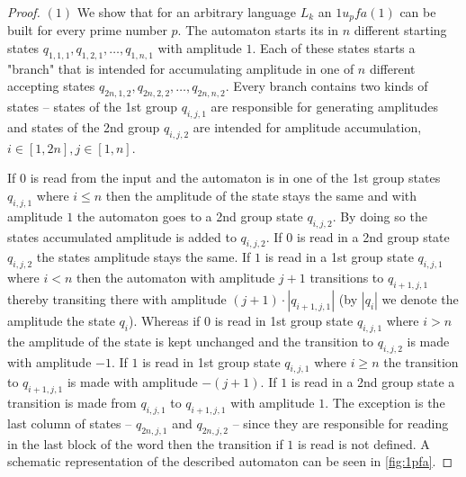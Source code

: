 \documentclass{llncs}
\begin{document}
\begin{definicija}
\begin{proof}
$(1)$ We show that for an arbitrary language $L_k$ an $1u_pfa(1)$ can be built for every prime number $p$. The automaton starts its in $n$ different starting states $q_{1,1,1},q_{1,2,1},\ldots,q_{1,n,1}$ with amplitude $1$. Each of these states starts a "branch" that is intended for accumulating amplitude in one of $n$ different accepting states $q_{2n,1,2},q_{2n,2,2},\ldots,q_{2n,n,2}$. Every branch contains two kinds of states -- states of the 1st group $q_{i,j,1}$ are responsible for generating amplitudes and states of the 2nd group $q_{i,j,2}$ are intended for amplitude accumulation, $i \in \left[1, 2n \right], j \in \left[1, n \right]$.

If $0$ is read from the input and the automaton is in one of the 1st group states $q_{i,j,1}$ where $i \leq n$ then the amplitude of the state stays the same and with amplitude $1$ the automaton goes to a 2nd group state $q_{i,j,2}$. By doing so the states accumulated amplitude is added to $q_{i,j,2}$. If $0$ is read in a 2nd group state $q_{i,j,2}$ the states amplitude stays the same. If $1$ is read in a 1st group state $q_{i,j,1}$ where $i < n$ then the automaton with amplitude $j + 1$ transitions to $q_{i + 1,j,1}$ thereby transiting there with amplitude $(j + 1) \cdot \left| q_{i + 1,j,1} \right|$ (by $|q_i|$ we denote the amplitude the state $q_i$).
Whereas if $0$ is read in 1st group state $q_{i,j,1}$ where $i > n$ the amplitude of the state is kept unchanged and the transition to $q_{i,j,2}$ is made with amplitude $-1$. If $1$ is read in 1st group state $q_{i,j,1}$ where $i \geq n$ the transition to $q_{i + 1,j,1}$ is made with amplitude $-(j + 1)$. If $1$ is read in a 2nd group state a transition is made from $q_{i,j,1}$ to $q_{i + 1,j,1}$ with amplitude $1$. The exception is the last column of states -- $q_{2n,j,1}$ and $q_{2n,j,2}$ -- since they are responsible for reading in the last block of the word then the transition if $1$ is read is not defined. A schematic representation of the described automaton can be seen in \ref{fig:1pfa}.


\end{proof}
\end{definicija}
\end{document}
